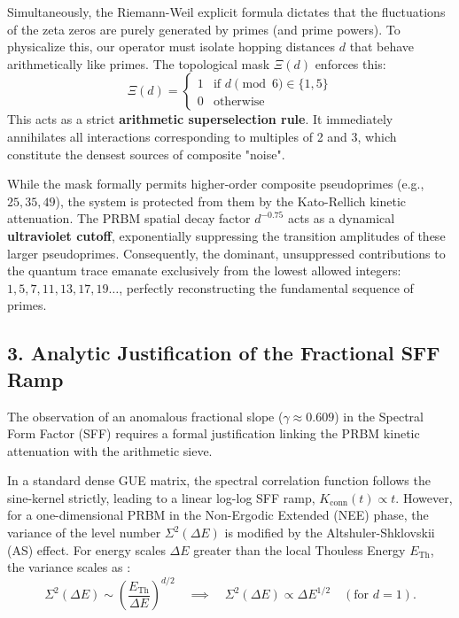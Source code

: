 \documentclass[aps,prl,preprint,superscriptaddress,floatfix]{revtex4-2}
\begin{document}
Simultaneously, the Riemann-Weil explicit formula dictates that the fluctuations of the zeta zeros are purely generated by primes (and prime powers). To physicalize this, our operator must isolate hopping distances $d$ that behave arithmetically like primes. The topological mask $\Xi(d)$ enforces this:
\begin{equation}
\Xi(d) = \begin{cases} 1 & \text{if } d \pmod 6 \in \{1, 5\} \\ 0 & \text{otherwise} \end{cases}
\end{equation}
This acts as a strict \textbf{arithmetic superselection rule}. It immediately annihilates all interactions corresponding to multiples of 2 and 3, which constitute the densest sources of composite "noise". 

While the mask formally permits higher-order composite pseudoprimes (e.g., $25, 35, 49$), the system is protected from them by the Kato-Rellich kinetic attenuation. The PRBM spatial decay factor $d^{-0.75}$ acts as a dynamical \textbf{ultraviolet cutoff}, exponentially suppressing the transition amplitudes of these larger pseudoprimes. Consequently, the dominant, unsuppressed contributions to the quantum trace emanate exclusively from the lowest allowed integers: $1, 5, 7, 11, 13, 17, 19\dots$, perfectly reconstructing the fundamental sequence of primes.

\subsection{3. Analytic Justification of the Fractional SFF Ramp}
The observation of an anomalous fractional slope ($\gamma \approx 0.609$) in the Spectral Form Factor (SFF) requires a formal justification linking the PRBM kinetic attenuation with the arithmetic sieve. 

In a standard dense GUE matrix, the spectral correlation function follows the sine-kernel strictly, leading to a linear log-log SFF ramp, $K_{\text{conn}}(t) \propto t$. However, for a one-dimensional PRBM in the Non-Ergodic Extended (NEE) phase, the variance of the level number $\Sigma^2(\Delta E)$ is modified by the Altshuler-Shklovskii (AS) effect. For energy scales $\Delta E$ greater than the local Thouless Energy $E_{\text{Th}}$, the variance scales as \cite{Kravtsov2015}:
\begin{equation}
\Sigma^2(\Delta E) \sim \left(\frac{E_{\text{Th}}}{\Delta E}\right)^{d/2} \quad \implies \quad \Sigma^2(\Delta E) \propto \Delta E^{1/2} \quad (\text{for } d=1).
\end{equation}
\end{document}
